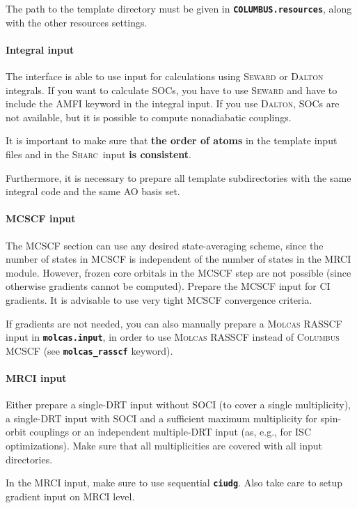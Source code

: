 \documentclass[a4paper,10pt,DIV=15,openany]{scrbook}
\newcommand{\sharc}{\textsc{Sharc}}
\newcommand{\ttt}[1]{\textbf{\texttt{#1}}}
\begin{document}
The path to the template directory must be given in \ttt{COLUMBUS.resources}, along with the other resources settings.

\paragraph{Integral input}

The interface is able to use input for calculations using \textsc{Seward} or \textsc{Dalton} integrals. 
If you want to calculate SOCs, you have to use \textsc{Seward} and have to include the AMFI keyword in the integral input.
If you use \textsc{Dalton}, SOCs are not available, but it is possible to compute nonadiabatic couplings.

It is important to make sure that \textbf{the order of atoms} in the template input files and in the \sharc\ input \textbf{is consistent}.

Furthermore, it is necessary to prepare all template subdirectories with the same integral code and the same AO basis set. 

\paragraph{MCSCF input}

The MCSCF section can use any desired state-averaging scheme, since the number of states in MCSCF is independent of the number of states in the MRCI module. However, frozen core orbitals in the MCSCF step are not possible (since otherwise gradients cannot be computed). Prepare the MCSCF input for CI gradients. It is advisable to use very tight MCSCF convergence criteria.

If gradients are not needed, you can also manually prepare a \textsc{Molcas} RASSCF input in \ttt{molcas.input}, in order to use \textsc{Molcas} RASSCF instead of \textsc{Columbus} MCSCF (see \ttt{molcas\_rasscf} keyword).

\paragraph{MRCI input}

Either prepare a single-DRT input without SOCI (to cover a single multiplicity), a single-DRT input with SOCI and a sufficient maximum multiplicity for spin-orbit couplings or an independent multiple-DRT input (as, e.g., for ISC optimizations). Make sure that all multiplicities are covered with all input directories.

In the MRCI input, make sure to use sequential \ttt{ciudg}. Also take care to setup gradient input on MRCI level.
\end{document}
